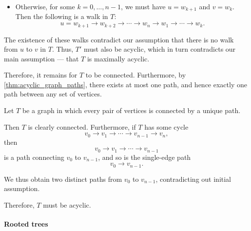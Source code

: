 \begin{defproof}
\begin{itemize}
    \item Otherwise, for some \( k = 0, \ldots, n - 1 \), we must have \( u = w_{k+1} \) and \( v = w_k \). Then the following is a walk in \( T \):
    \begin{equation*}
      u = w_{k+1} \to w_{k+2} \to \cdots \to w_n \to w_1 \to \cdots \to w_k.
    \end{equation*}
  \end{itemize}

  The existence of these walks contradict our assumption that there is no walk from \( u \) to \( v \) in \( T \). Thus, \( T' \) must also be acyclic, which in turn contradicts our main assumption --- that \( T \) is maximally acyclic.

  Therefore, it remains for \( T \) to be connected. Furthermore, by \cref{thm:acyclic_graph_paths}, there exists at most one path, and hence exactly one path between any set of vertices.

   Let \( T \) be a graph in which every pair of vertices is connected by a unique path.

  Then \( T \) is clearly connected. Furthermore, if \( T \) has some cycle
  \begin{equation*}
    v_0 \to v_1 \to \cdots \to v_{n-1} \to v_n,
  \end{equation*}
  then
  \begin{equation*}
    v_0 \to v_1 \to \cdots \to v_{n-1}
  \end{equation*}
  is a path connecting \( v_0 \) to \( v_{n-1} \), and so is the single-edge path
  \begin{equation*}
    v_0 \to v_{n-1}.
  \end{equation*}

  We thus obtain two distinct paths from \( v_0 \) to \( v_{n-1} \), contradicting out initial assumption.

  Therefore, \( T \) must be acyclic.
\end{defproof}

\paragraph{Rooted trees}

